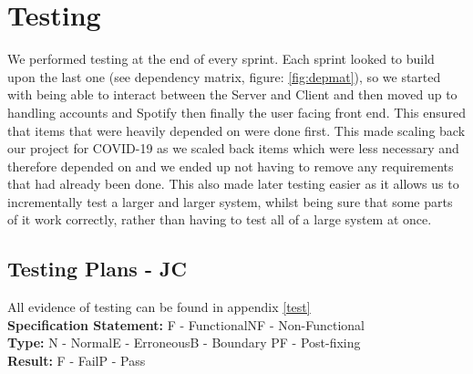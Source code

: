\documentclass[10pt, notitlepage]{report}
\begin{document}
\chapter{Testing}

We performed testing at the end of every sprint. Each sprint looked to build upon the last one (see dependency matrix, figure: \ref{fig:depmat}), so we started with being able to interact between the Server and Client and then moved up to handling accounts and Spotify then finally the user facing front end. This ensured that items that were heavily depended on were done first. This made scaling back our project for COVID-19 as we scaled back items which were less necessary and therefore depended on and we ended up not having to remove any requirements that had already been done. This also made later testing easier as it allows us to incrementally test a larger and larger system, whilst being sure that some parts of it work correctly, rather than having to test all of a large system at once. 

\section{Testing Plans - JC}

All evidence of testing can be found in appendix \ref{test}\\
\textbf{Specification Statement:} F - Functional\quad\quad NF - Non-Functional\\
\textbf{Type:} N - Normal\quad\quad  E - Erroneous\quad\quad  B - Boundary \quad \quad PF - Post-fixing\\
\textbf{Result:} F - Fail\quad\quad  P - Pass
\end{document}
